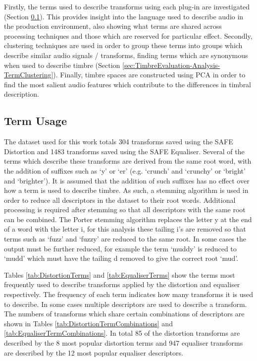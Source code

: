 	Firstly, the terms used to describe transforms using each plug-in are investigated (Section
	\ref{sec:TimbreEvaluation-Analysis-TermUsage}). This provides insight into the language used to describe audio in
	the production environment, also showing what terms are shared across processing techniques and those which are
	reserved for particular effect. Secondly, clustering techniques are used in order to group these terms into groups
	which describe similar audio signals / transforms, finding terms which are synonymous when used to describe
	timbre (Section \ref{sec:TimbreEvaluation-Analysis-TermClustering}). Finally, timbre spaces are constructed using
	PCA in order to find the most salient audio features which contribute to the differences in timbral description.

	\subsection{Term Usage}
	\label{sec:TimbreEvaluation-Analysis-TermUsage}
		The dataset used for this work totals 304 transforms saved using the SAFE Distortion and 1483 transforms
		saved using the SAFE Equaliser. Several of the terms which describe these transforms are derived from the
		same root word, with the addition of suffixes such as `y' or `er' (e.g. `crunch' and `crunchy' or `bright'
		and `brighter'). It is assumed that the addition of such suffixes has no effect over how a term is used to
		describe timbre. As such, a stemming algorithm \citep{porter1980an} is used in order to reduce all
		descriptors in the dataset to their root words.  Additional processing is required after stemming so that
		all descriptors with the same root can be combined.  The Porter stemming algorithm replaces the letter y at
		the end of a word with the letter i, for this analysis these tailing i's are removed so that terms such as
		`fuzz' and `fuzzy' are reduced to the same root. In some cases the output must be further reduced, for
		example the term `muddy' is reduced to `mudd' which must have the tailing d removed to give the correct
		root `mud'.

		Tables \ref{tab:DistortionTerms} and \ref{tab:EqualiserTerms} show the terms most frequently used to
		describe transforms applied by the distortion and equaliser respectively. The frequency of each term
		indicates how many transforms it is used to describe. In some cases multiple descriptors are used to
		describe a transform. The numbers of transforms which share certain combinations of descriptors are shown
		in Tables \ref{tab:DistortionTermCombinations} and \ref{tab:EqualiserTermCombinations}. In total 85 of the
		distortion transforms are described by the 8 most popular distortion terms and 947 equaliser transforms are
		described by the 12 most popular equaliser descriptors.

